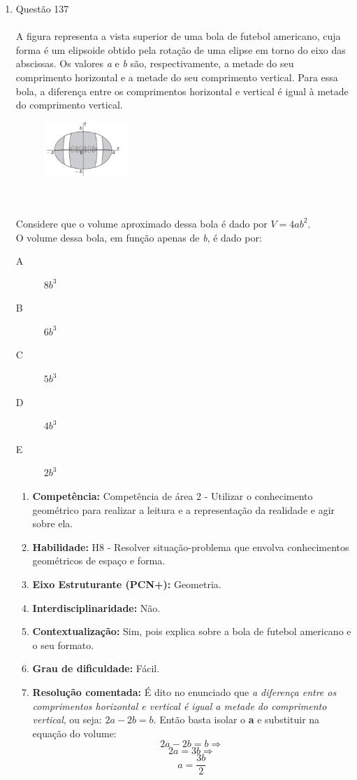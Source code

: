 \documentclass[a4paper, 12pt]{article}
\begin{document}
\begin{enumerate}
\begin{enumerate}
  \end{enumerate}
\item Questão 137 \\\\
  A figura representa a vista superior de uma bola de futebol americano, cuja forma é um elipsoide obtido pela rotação de uma  elipse  em  torno  do  eixo  das  abscissas.  Os  valores \emph{a} e \emph{b} são,  respectivamente,  a  metade  do  seu  comprimento horizontal  e  a  metade  do  seu  comprimento  vertical.  Para essa  bola,  a  diferença  entre  os  comprimentos  horizontal e vertical é igual à metade do comprimento vertical.
   \begin{figure}[h!]
   \centering
   \includegraphics[width=0.3\textwidth]{1}
   \end{figure} \\\\
   Considere que o volume aproximado dessa bola é dado por $ V = 4ab^{2} $.\\
   O volume dessa bola, em função apenas de \emph{b}, é dado por: \\
   \begin{description}
   \item[A] $8b^{3}$
   \item[B] $6b^{3}$
   \item[C] $5b^{3}$
   \item[D] $4b^{3}$
   \item[E] $2b^{3}$     
   \end{description}

  \begin{enumerate}
  \item \textbf{Competência: }
    Competência de área 2 - Utilizar o conhecimento geométrico para realizar a leitura e a representação da realidade e agir sobre ela.
  \item \textbf{Habilidade: }
    H8 - Resolver situação-problema que envolva conhecimentos geométricos de espaço e forma.
  \item \textbf{Eixo Estruturante (PCN+): }
    Geometria.
  \item \textbf{Interdisciplinaridade: }
    Não.
  \item \textbf{Contextualização: }
    Sim, pois explica sobre a bola de futebol americano e o seu formato.
  \item \textbf{Grau de dificuldade: }
    Fácil.
  \item \textbf{Resolução comentada: }
    É dito no enunciado que \emph{a diferença entre os comprimentos horizontal e vertical é igual a metade do comprimento vertical}, ou seja: $2a-2b = b$. Então basta isolar o \textbf{a} e substituir na equação do volume:
    $$2a-2b = b \Rightarrow $$
    $$2a = 3b \Rightarrow $$
    $$a = \frac{3b}{2} $$\\
    

\end{enumerate}
\end{enumerate}
\end{document}

